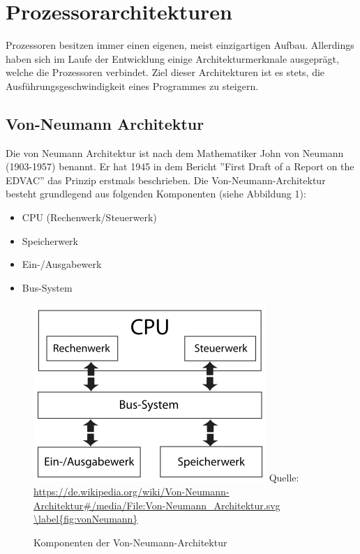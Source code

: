 \documentclass[12pt]{article}
\begin{document}
\newpage
\section{Prozessorarchitekturen}
Prozessoren besitzen immer einen eigenen, meist einzigartigen Aufbau. Allerdings haben sich im Laufe der Entwicklung einige Architekturmerkmale ausgeprägt, welche die Prozessoren verbindet. 
Ziel dieser Architekturen ist es stets, die Ausführungsgeschwindigkeit eines Programmes zu steigern.
\subsection{Von-Neumann Architektur}
Die von Neumann Architektur ist nach dem Mathematiker John von Neumann (1903-1957) benannt. Er hat 1945 in dem Bericht ''First Draft of a Report on the EDVAC'' das Prinzip erstmals beschrieben.
Die Von-Neumann-Architektur besteht grundlegend aus folgenden Komponenten \cite{von1993first} (siehe Abbildung 1):
\begin{samepage}
\begin{itemize}
\item CPU (Rechenwerk/Steuerwerk)
\item Speicherwerk 
\item Ein-/Ausgabewerk
\item Bus-System
\end{itemize}
\end{samepage}


\begin{figure}[!htb]
\centering
\includegraphics[scale=0.60]{Von-Neumann_Architektur}
\small Quelle: \url{https://de.wikipedia.org/wiki/Von-Neumann-Architektur#/media/File:Von-Neumann_Architektur.svg
\label{fig:vonNeumann}}
\caption{Komponenten der Von-Neumann-Architektur}
\end{figure}
\end{document}
